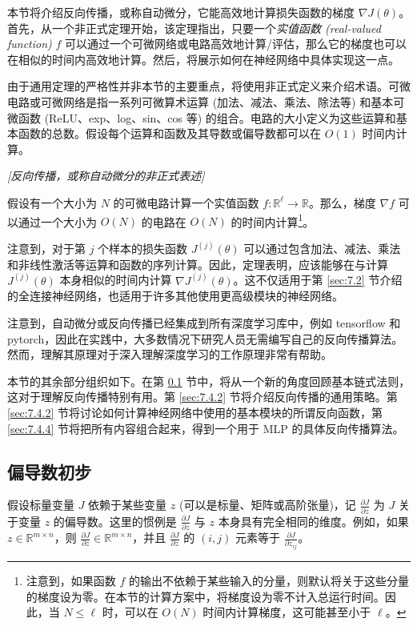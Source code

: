 本节将介绍反向传播，或称自动微分，它能高效地计算损失函数的梯度 $\nabla J(\theta)$。首先，从一个非正式定理开始，该定理指出，只要一个\textit{实值函数 (real-valued function)} $f$ 可以通过一个可微网络或电路高效地计算/评估，那么它的梯度也可以在相似的时间内高效地计算。然后，将展示如何在神经网络中具体实现这一点。

由于通用定理的严格性并非本节的主要重点，将使用非正式定义来介绍术语。可微电路或可微网络是指一系列可微算术运算 (加法、减法、乘法、除法等) 和基本可微函数 (ReLU、exp、log、sin、cos 等) 的组合。电路的大小定义为这些运算和基本函数的总数。假设每个运算和函数及其导数或偏导数都可以在 $O(1)$ 时间内计算。

\begin{theorem}\label{theorem:7.4.1}
    \textit{[反向传播，或称自动微分的非正式表述]} 
    
    \noindent 假设有一个大小为 $N$ 的可微电路计算一个实值函数 $f: \mathbb{R}^\ell \to \mathbb{R}$。那么，梯度 $\nabla f$ 可以通过一个大小为 $O(N)$ 的电路在 $O(N)$ 的时间内计算\footnote{注意到，如果函数 $f$ 的输出不依赖于某些输入的分量，则默认将关于这些分量的梯度设为零。在本节的计算方案中，将梯度设为零不计入总运行时间。因此，当 $N \le \ell$ 时，可以在 $O(N)$ 时间内计算梯度，这可能甚至小于 $\ell$。}。
\end{theorem}

注意到，对于第 $j$ 个样本的损失函数 $J^{(j)}(\theta)$ 可以通过包含加法、减法、乘法和非线性激活等运算和函数的序列计算。因此，定理表明，应该能够在与计算 $J^{(j)}(\theta)$ 本身相似的时间内计算 $\nabla J^{(j)}(\theta)$。这不仅适用于第 \ref{sec:7.2} 节介绍的全连接神经网络，也适用于许多其他使用更高级模块的神经网络。

注意到，自动微分或反向传播已经集成到所有深度学习库中，例如 tensorflow 和 pytorch，因此在实践中，大多数情况下研究人员无需编写自己的反向传播算法。然而，理解其原理对于深入理解深度学习的工作原理非常有帮助。

本节的其余部分组织如下。在第 \ref{sec:7.4.1} 节中，将从一个新的角度回顾基本链式法则，这对于理解反向传播特别有用。第 \ref{sec:7.4.2} 节将介绍反向传播的通用策略。第 \ref{sec:7.4.2} 节将讨论如何计算神经网络中使用的基本模块的所谓反向函数，第 \ref{sec:7.4.4} 节将把所有内容组合起来，得到一个用于 MLP 的具体反向传播算法。

\subsection{偏导数初步}\label{sec:7.4.1}

假设标量变量 $J$ 依赖于某些变量 $z$ (可以是标量、矩阵或高阶张量)，记 $\frac{\partial J}{\partial z}$ 为 $J$ 关于变量 $z$ 的偏导数。这里的惯例是 $\frac{\partial J}{\partial z}$ 与 $z$ 本身具有完全相同的维度。例如，如果 $z \in \mathbb{R}^{m \times n}$，则 $\frac{\partial J}{\partial z} \in \mathbb{R}^{m \times n}$，并且 $\frac{\partial J}{\partial z}$ 的 $(i, j)$ 元素等于 $\frac{\partial J}{\partial z_{ij}}$。

